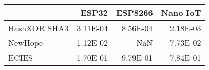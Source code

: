 \begin{tabular}{lrrr}
\toprule
{} &    ESP32 &  ESP8266 &  Nano IoT \\
\midrule
HashXOR SHA3 & 3.11E-04 & 8.56E-04 &  2.18E-03 \\
NewHope      & 1.12E-02 &      NaN &  7.73E-02 \\
ECIES        & 1.70E-01 & 9.79E-01 &  7.84E-01 \\
\bottomrule
\end{tabular}
